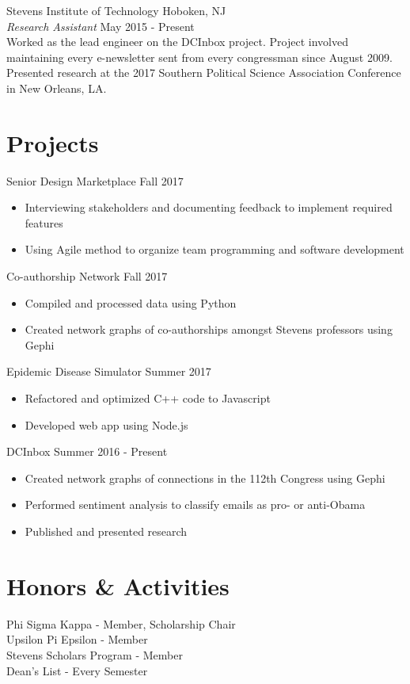 \documentclass{res}
\begin{document}
{Stevens Institute of Technology \hfill Hoboken, NJ \\
{\sl Research Assistant} \hfill May 2015 - Present \\
Worked as the lead engineer on the DCInbox project. Project involved maintaining every e-newsletter sent from every congressman since August 2009. Presented research at the 2017 Southern Political Science Association Conference in New Orleans, LA.


\section{\bf\large Projects}
Senior Design Marketplace \hfill Fall 2017
\begin{itemize}
	\item Interviewing stakeholders and documenting feedback to implement required features
	\item Using Agile method to organize team programming and software development
\end{itemize}

Co-authorship Network \hfill Fall 2017
\begin{itemize}
	\item Compiled and processed data using Python
	\item Created network graphs of co-authorships amongst Stevens professors using Gephi
\end{itemize}

Epidemic Disease Simulator \hfill Summer 2017
\begin{itemize}
	\item Refactored and optimized C++ code to Javascript
	\item Developed web app using Node.js
\end{itemize}

DCInbox \hfill Summer 2016 - Present
\begin{itemize}
	\item Created network graphs of connections in the 112th Congress using Gephi
	\item Performed sentiment analysis to classify emails as pro- or anti-Obama
	\item Published and presented research

\end{itemize}

\section{\bf\large Honors \& Activities}
Phi Sigma Kappa - Member, Scholarship Chair \\
Upsilon Pi Epsilon - Member \\
Stevens Scholars Program - Member \\
Dean's List - Every Semester



}
\end{document}
